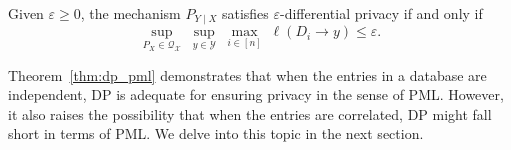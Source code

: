 \begin{theorem}
\label{thm:dp_pml}
Given $\varepsilon \geq 0$, the mechanism $P_{Y \mid X}$ satisfies $\varepsilon$-differential privacy if and only if 
\begin{equation*}
    \sup_{P_X \in \mathcal Q_\mathcal X} \; \sup_{y \in \mathcal Y} \; \max_{i \in [n]} \; \ell(D_i \to y) \leq \varepsilon. 
\end{equation*}
\end{theorem}

Theorem~\ref{thm:dp_pml} demonstrates that when the entries in a database are independent, DP is adequate for ensuring privacy in the sense of PML. However, it also raises the possibility that when the entries are correlated, DP might fall short in terms of PML. We delve into this topic in the next section. 
